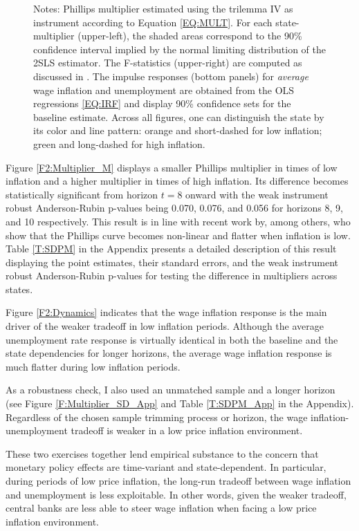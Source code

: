 \documentclass[12pt]{article}
\newcommand{\annote}[1]{\parbox{\textwidth}{\renewcommand{\baselinestretch}{1.0}\vspace{12pt} \footnotesize Notes: #1}}
\begin{document}
\begin{figure}[h!]
\begin{subfigure}[b]{0.9\textwidth}
		\end{subfigure}
		\annote{Phillips multiplier estimated using the trilemma IV as instrument according to Equation \eqref{EQ:MULT}. For each state-multiplier (upper-left), the shaded areas correspond to the 90\% confidence interval implied by the normal limiting distribution of the 2SLS estimator. The F-statistics (upper-right) are computed as discussed in \cite{Olea2013}. The impulse responses (bottom panels) for \textit{average} wage inflation and unemployment are obtained from the OLS regressions \eqref{EQ:IRF} and display 90\% confidence sets for the baseline estimate. Across all figures, one can distinguish the state by its color and line pattern: orange and short-dashed for low inflation; green and long-dashed for high inflation.}
	
\end{figure}

Figure \ref{F2:Multiplier_M} displays a smaller Phillips multiplier in times of low inflation and a higher multiplier in times of high inflation. Its difference becomes statistically significant from horizon $t=8$ onward with the weak instrument robust Anderson-Rubin p-values being 0.070, 0.076, and 0.056 for horizons 8, 9, and 10 respectively. This result is in line with recent work by, among others, \cite{Forbes2021} who show that the Phillips curve becomes non-linear and flatter when inflation is low. Table \ref{T:SDPM} in the Appendix presents a detailed description of this result displaying the point estimates, their standard errors, and the weak instrument robust Anderson-Rubin p-values for testing the difference in multipliers across states.

Figure \ref{F2:Dynamics} indicates that the wage inflation response is the main driver of the weaker tradeoff in low inflation periods. Although the average unemployment rate response is virtually identical in both the baseline and the state dependencies for longer horizons, the average wage inflation response is much flatter during low inflation periods. 

As a robustness check, I also used an unmatched sample and a longer horizon (see Figure \ref{F:Multiplier_SD_App} and Table \ref{T:SDPM_App} in the Appendix). Regardless of the chosen sample trimming process or horizon, the wage inflation-unemployment tradeoff is weaker in a low price inflation environment.

These two exercises together lend empirical substance to the concern that monetary policy effects are time-variant and state-dependent. In particular, during periods of low price inflation, the long-run tradeoff between wage inflation and unemployment is less exploitable. In other words, given the weaker tradeoff, central banks are less able to steer wage inflation when facing a low price inflation environment.
\end{document}
